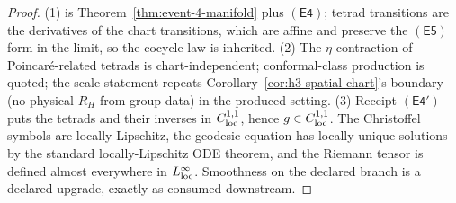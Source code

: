 \documentclass[11pt]{article}
\begin{document}
\begin{proof}
(1) is Theorem~\ref{thm:event-4-manifold} plus \(\mathsf{(E4)}\); tetrad
transitions are the derivatives of the chart transitions, which are affine
and preserve the \(\mathsf{(E5)}\) form in the limit, so the cocycle law is inherited. (2) The
\(\eta\)-contraction of Poincar\'e-related tetrads is chart-independent;
conformal-class production is quoted; the scale statement repeats
Corollary~\ref{cor:h3-spatial-chart}'s boundary (no physical \(R_H\) from
group data) in the produced setting. (3) Receipt \(\mathsf{(E4')}\) puts the
tetrads and their inverses in \(C^{1,1}_{\rm loc}\), hence
\(g\in C^{1,1}_{\rm loc}\). The Christoffel symbols are locally Lipschitz,
the geodesic equation has locally unique solutions by the standard
locally-Lipschitz ODE theorem, and the Riemann tensor is defined almost
everywhere in \(L^\infty_{\rm loc}\). Smoothness on the declared branch is a
declared upgrade, exactly as consumed downstream.
\end{proof}
\end{document}
